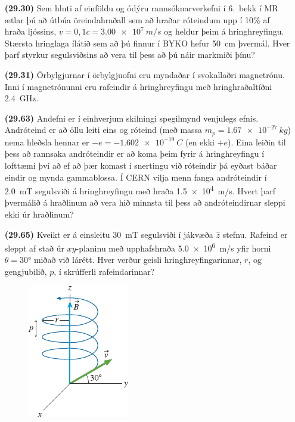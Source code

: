 \ifdefined \wholebook \else\documentclass[oneside]{book}\usepackage{EdlBook}\graphicspath{{figures/}}
\begin{document}
\begin{enumerate}[label = \textbf{(\alph*)}]

\item[\textbf{(29.30)}] Sem hluti af einföldu og ódýru rannsóknarverkefni í 6.~bekk í MR ætlar þú að útbúa öreindahraðall sem að hraðar róteindum upp í 10\% af hraða ljóssins, $v = 0,1c = \SI{3.00e7}{m/s}$ og heldur þeim á hringhreyfingu. Stærsta hringlaga ílátið sem að þú finnur í BYKO hefur \SI{50}{cm} þvermál. Hver þarf styrkur segulsviðsins að vera til þess að þú náir markmiði þínu?

\item[\textbf{(29.31)}] Örbylgjurnar í örbylgjuofni eru myndaðar í svokallaðri magnetrónu. Inni í magnetrónunni eru rafeindir á hringhreyfingu með hringhraðaltíðni \SI{2.4}{GHz}. 


\item[\textbf{(29.63)}] Andefni er í einhverjum skilningi spegilmynd venjulegs efnis. Andróteind er að öllu leiti eins og róteind (með massa $m_p = \SI{1.67e-27}{kg}$) nema hleðsla hennar er $-e = \SI{-1.602e-19}{C}$ (en ekki $+e$). Eina leiðin til þess að rannsaka andróteindir er að koma þeim fyrir á hringhreyfingu í lofttæmi því að ef að þær komast í snertingu við róteindir þá eyðast báðar eindir og mynda gammablossa. Í CERN vilja menn fanga andróteindir í \SI{2.0}{mT} segulsviði á hringhreyfingu með hraða \SI{1.5e4}{m/s}. Hvert þarf þvermálið á hraðlinum að vera hið minnsta til þess að andróteindirnar sleppi ekki úr hraðlinum?


\item[\textbf{(29.65)}] Kveikt er á einsleitu \SI{30}{mT} segulsviði í jákvæða $\hat{z}$ stefnu. Rafeind er sleppt af stað úr $xy$-planinu með upphafshraða \SI{5.0e6}{m/s} yfir horni $\theta = \ang{30}$ miðað við lárétt. Hver verður geisli hringhreyfingarinnar, $r$, og gengjubilið, $p$, í skrúfferli rafeindarinnar?

\begin{figure}[H]
    \centering
    \includegraphics{figures/rk2965.pdf}
\end{figure}


\end{enumerate}
\end{document}
